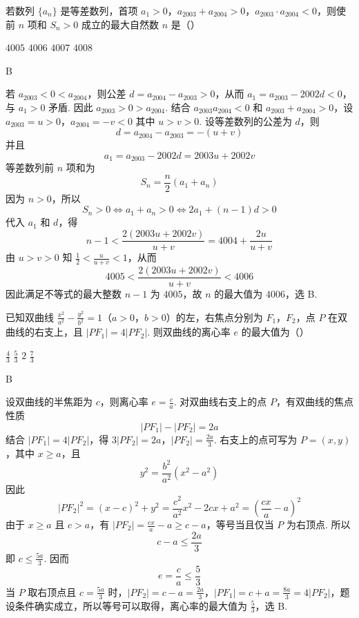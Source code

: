 \begin{problem}
若数列 \( \{a_{n}\} \) 是等差数列，首项 \(a_{1}>0\)，\(a_{2003}+a_{2004}>0\)，\(a_{2003}\cdot a_{2004}<0\)，则使前 \(n\) 项和 \( S_{n}>0 \) 成立的最大自然数 \(n\) 是（\quad）

\choices
    {\(4005\)}
    {\(4006\)}
    {\(4007\)}
    {\(4008\)}
\end{problem}

\begin{answer}
B
\end{answer}

\begin{solution}
若 \(a_{2003}<0<a_{2004}\)，则公差 \(d=a_{2004}-a_{2003}>0\)，从而 \(a_1=a_{2003}-2002d<0\)，与 \(a_1>0\) 矛盾. 因此 \(a_{2003}>0>a_{2004}\). 结合 \(a_{2003}a_{2004}<0\) 和 \(a_{2003}+a_{2004}>0\)，设
\(a_{2003}=u>0\)，\(a_{2004}=-v<0\)
其中 \(u>v>0\). 设等差数列的公差为 \(d\)，则
\[
d=a_{2004}-a_{2003}=-(u+v)
\]
并且
\[
a_1=a_{2003}-2002d=2003u+2002v
\]
等差数列前 \(n\) 项和为
\[
S_n=\frac{n}{2}(a_1+a_n)
\]
因为 \(n>0\)，所以
\[
S_n>0\Longleftrightarrow a_1+a_n>0\Longleftrightarrow 2a_1+(n-1)d>0
\]
代入 \(a_1\) 和 \(d\)，得
\[
n-1<\frac{2(2003u+2002v)}{u+v}=4004+\frac{2u}{u+v}
\]
由 \(u>v>0\) 知 \(\frac{1}{2}<\frac{u}{u+v}<1\)，从而
\[
4005<\frac{2(2003u+2002v)}{u+v}<4006
\]
因此满足不等式的最大整数 \(n-1\) 为 \(4005\)，故 \(n\) 的最大值为 \(4006\)，选 B.
\end{solution}

\begin{problem}
已知双曲线 \(\frac{x^2}{a^2} - \frac{y^2}{b^2} = 1\)（\(a > 0\)，\(b > 0\)）的左，右焦点分别为 \(F_1\)，\(F_2\)，点 \(P\) 在双曲线的右支上，且 \(|PF_1| = 4|PF_2|\). 则双曲线的离心率 \(e\) 的最大值为（\quad）

\choices
    {\( \frac{4}{3} \)}
    {\( \frac{5}{3} \)}
    {\(2\)}
    {\( \frac{7}{3} \)}
\end{problem}

\begin{answer}
B
\end{answer}

\begin{solution}
设双曲线的半焦距为 \(c\)，则离心率 \(e=\frac{c}{a}\). 对双曲线右支上的点 \(P\)，有双曲线的焦点性质
\[
|PF_1|-|PF_2|=2a
\]
结合 \(|PF_1|=4|PF_2|\)，得
\(3|PF_2|=2a\)，\(|PF_2|=\frac{2a}{3}\).
右支上的点可写为 \(P=(x,y)\)，其中 \(x\geqslant a\)，且
\[
y^2=\frac{b^2}{a^2}(x^2-a^2)
\]
因此
\[
|PF_2|^2=(x-c)^2+y^2=\frac{c^2}{a^2}x^2-2cx+a^2=\left(\frac{cx}{a}-a\right)^2
\]
由于 \(x\geqslant a\) 且 \(c>a\)，有 \(|PF_2|=\frac{cx}{a}-a\geqslant c-a\)，等号当且仅当 \(P\) 为右顶点. 所以
\[
c-a\leqslant\frac{2a}{3}
\]
即 \(c\leqslant\frac{5a}{3}\). 因而
\[
e=\frac{c}{a}\leqslant\frac{5}{3}
\]
当 \(P\) 取右顶点且 \(c=\frac{5a}{3}\) 时，\(|PF_2|=c-a=\frac{2a}{3}\)，\(|PF_1|=c+a=\frac{8a}{3}=4|PF_2|\)，题设条件确实成立，所以等号可以取得，离心率的最大值为 \(\frac{5}{3}\)，选 B.
\end{solution}

